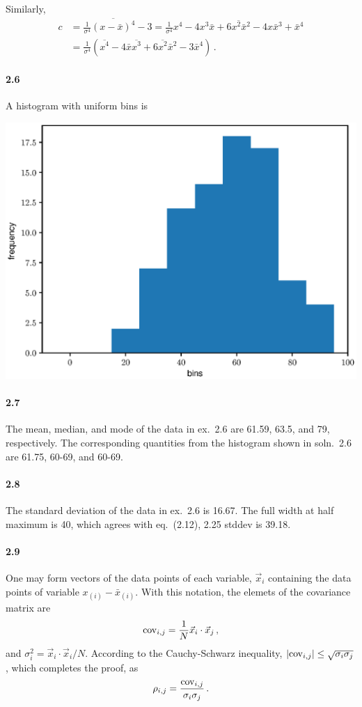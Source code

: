 \documentclass[a4paper,12pt]{article}
\begin{document}
Similarly,
\[
 \begin{aligned}
  c &= \frac{1}{\sigma^4}\overline{(x-\bar{x})^4} - 3 = \frac{1}{\sigma^4}\overline{x^4 - 4 x^3\bar{x} + 6 x^2\bar{x}{}^2 - 4 x \bar{x}{}^3 + \bar{x}{}^4}\\
  &= \frac{1}{\sigma^4}(\overline{x^4}-4 \bar{x}\overline{x^3} + 6\overline{x^2}\bar{x}{}^2 -3\bar{x}{}^4)\,.
 \end{aligned}
\]

\paragraph{2.6} A histogram with uniform bins is
\begin{center}
 \includegraphics[scale=.5]{ca/ex2.6.eps}
\end{center}

\paragraph{2.7} The mean, median, and mode of the data in ex.\ 2.6 are 61.59, 63.5, and 79, respectively. The corresponding quantities from the histogram shown in soln.\ 2.6 are 61.75, 60-69, and 60-69.

\paragraph{2.8} The standard deviation of the data in ex.\ 2.6 is 16.67. The full width at half maximum is 40, which agrees with eq.\ (2.12), 2.25 stddev is 39.18.


\paragraph{2.9} One may form vectors of the data points of each variable, $\vec{x}_i$ containing the data points of variable $x_{(i)} - \bar{x}_{(i)}$. With this notation, the elemets of the covariance matrix are
\[
 {\rm cov}_{i,j} = \frac{1}{N}\vec{x}_i\cdot \vec{x}_j\,,
\]
and $\sigma_i^2 = \vec{x}_i \cdot \vec{x}_i / N$. According to the Cauchy-Schwarz inequality,
$|{\rm cov}_{i,j}| \le \sqrt{\sigma_i \sigma_j}$, which completes the proof, as
\[
 \rho_{i,j} = \frac{{\rm cov}_{i,j}}{\sigma_i\sigma_j}\,.
\]
\end{document}
